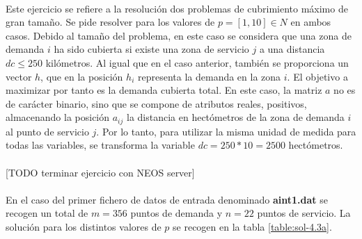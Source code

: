 \documentclass[spanish]{article}
\begin{document}
			\paragraph{}
			Este ejercicio se refiere a la resolución dos problemas de cubrimiento máximo de gran tamaño. Se pide resolver para los valores de $p = [1, 10] \in N$ en ambos casos. Debido al tamaño del problema, en este caso se considera que una zona de demanda $i$ ha sido cubierta si existe una zona de servicio $j$ a una distancia $dc \leq 250$ kilómetros. Al igual que en el caso anterior, también se proporciona un vector $h$, que en la posición $h_i$ representa la demanda en la zona $i$. El objetivo a maximizar por tanto es la demanda cubierta total. En este caso, la matriz $a$ no es de carácter binario, sino que se compone de atributos reales, positivos, almacenando la posición $a_{ij}$ la distancia en hectómetros de la zona de demanda $i$ al punto de servicio $j$. Por lo tanto, para utilizar la misma unidad de medida para todas las variables, se transforma la variable $dc = 250 * 10 = 2500$ hectómetros.

			\paragraph{}
			[TODO terminar ejercicio con NEOS server]

			\paragraph{}
			En el caso del primer fichero de datos de entrada denominado \textbf{aint1.dat} se recogen un total de $m = 356$ puntos de demanda y $n=22$ puntos de servicio. La solución para los distintos valores de $p$ se recogen en la tabla \ref{table:sol-4.3a}.
\end{document}
